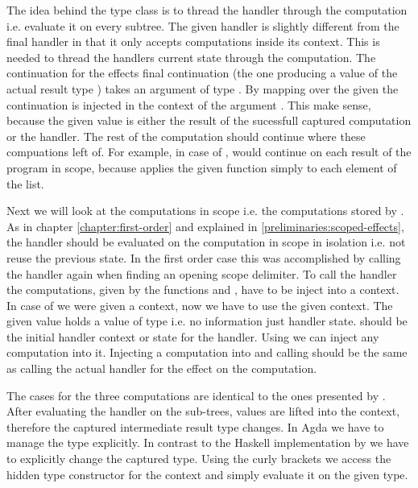 The idea behind the  type class is to thread the handler
through the computation i.e. evaluate it on every subtree.
The given handler  is slightly different from the final
handler in that it only accepts computations inside its context.
This is needed to thread the handlers current state through the computation.
The continuation for the effects final continuation (the one producing a value
of the actual result type ) takes an argument of type
.
By mapping  over the given  the continuation is
injected in the context of the argument .
This make sense, because the given value is either the result of the sucessfull
captured computation or the handler.
The rest of the computation should continue where these compuations left of.
For example, in case of ,  would continue
on each result of the program in scope, because \AgdaFunction{<\$>} applies the
given function simply to each element of the list.

Next we will look at the computations in scope i.e. the computations stored by
.
As in chapter \ref{chapter:first-order} and explained in
\ref{preliminaries:scoped-effects}, the handler should be evaluated on the
computation in scope in isolation i.e. not reuse the previous state.
In the first order case this was accomplished by calling the handler again when
finding an opening scope delimiter.
To call the handler the computations, given by the functions 
and , have to be inject into a context.
In case of  we were given a context, now we have to use the
given context.
The given value  holds a value of type  i.e.
no information just handler state.
 should be the initial handler context or state for the
handler.
Using \AgdaFunction{<\$} we can inject any computation into it.
Injecting a computation into  and calling 
should be the same as calling the actual handler for the effect on the
computation.

The cases for the three computations are identical to the ones presented by
\citeauthor{DBLP:conf/haskell/WuSH14}.
After evaluating the handler on the sub-trees, values are lifted into the
context, therefore the captured intermediate result type changes.
In Agda we have to manage the type explicitly.
In contrast to the Haskell implementation by 
\citeauthor{DBLP:conf/haskell/WuSH14} we have to explicitly change the captured 
type.
Using the curly brackets we access the hidden type constructor 
for the context and simply evaluate it on the given type.

